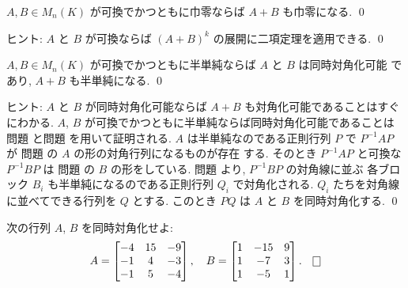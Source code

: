 \documentclass[12pt,twoside]{jarticle}
\begin{document}

\begin{question}
\label{q:nilpotent:A+B}
  $A,B\in M_n(K)$ が可換でかつともに巾零ならば $A+B$ も巾零になる.
  \qed
\end{question}

\noindent
ヒント:  $A$ と $B$ が可換ならば $(A+B)^k$ の展開に二項定理を適用できる.
\qed


\begin{question}[同時対角化]
\label{q:semisimple:A+B}
  $A,B\in M_n(K)$ が可換でかつともに半単純ならば $A$ と $B$ は同時対角化可能
  であり, $A+B$ も半単純になる.
  \qed
\end{question}

\noindent
ヒント: $A$ と $B$ が同時対角化可能ならば $A+B$ も対角化可能であることはすぐ
にわかる. $A$, $B$ が可換でかつともに半単純ならば同時対角化可能であることは
問題  と問題  
を用いて証明される. 
$A$ は半単純なのである正則行列 $P$ で $P^{-1}AP$ が
問題  の $A$ の形の対角行列になるものが存在
する. そのとき $P^{-1}AP$ と可換な $P^{-1}BP$ は
問題  の $B$ の形をしている.  
問題  より, $P^{-1}BP$ の対角線に並ぶ
各ブロック $B_i$ も半単純になるのである正則行列 $Q_i$ で対角化される. 
$Q_i$ たちを対角線に並べてできる行列を $Q$ とする.
このとき $PQ$ は $A$ と $B$ を同時対角化する.
\qed


\begin{question}
\label{q:doji-taikakuka}
  次の行列 $A$, $B$ を同時対角化せよ:
  \begin{equation*}
    A =
    \begin{bmatrix}
      -4 & 15 & -9 \\
      -1 &  4 & -3 \\
      -1 &  5 & -4 \\
    \end{bmatrix},
    \quad
    B =
    \begin{bmatrix}
      1 & -15 & 9 \\
      1 &  -7 & 3 \\
      1 &  -5 & 1 \\
    \end{bmatrix}.
    \qed
  \end{equation*}
\end{question}
\end{document}
